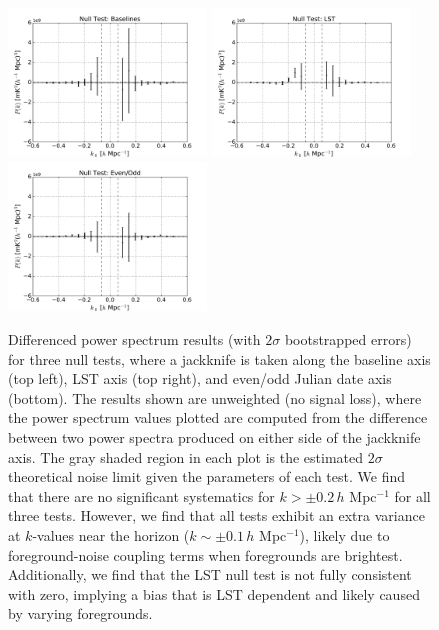 \documentclass[preprint2,numberedappendix,tighten]{aastex6}  %
\begin{document}
\begin{figure}
	\centering
	\includegraphics[width=0.47\textwidth]{plots/null_bls.pdf}
	\includegraphics[width=0.47\textwidth]{plots/null_lsts.pdf}
	\includegraphics[width=0.47\textwidth]{plots/null_eo.pdf}
	\caption{Differenced power spectrum results (with $2\sigma$ bootstrapped errors) for three null tests, where a jackknife is taken along the baseline axis (top left), LST axis (top right), and even/odd Julian date axis (bottom). The results shown are unweighted (no signal loss), where the power spectrum values plotted are computed from the difference between two power spectra produced on either side of the jackknife axis. The gray shaded region in each plot is the estimated $2\sigma$ theoretical noise limit given the parameters of each test. We find that there are no significant systematics for $k > \pm 0.2$\,$h$ Mpc$^{-1}$ for all three tests. However, we find that all tests exhibit an extra variance at $k$-values near the horizon ($k\sim\pm 0.1$\,$h$ Mpc$^{-1}$), likely due to foreground-noise coupling terms when foregrounds are brightest. Additionally, we find that the LST null test is not fully consistent with zero, implying a bias that is LST dependent and likely caused by varying foregrounds.}
	\label{fig:null}
\end{figure}
\end{document}
